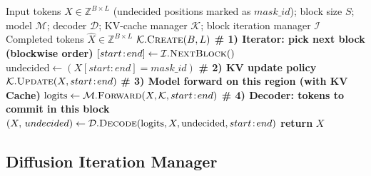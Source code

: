 \documentclass[]{antgroup}
\newcommand{\sys}{dInfer}
\begin{document}
\begin{algorithm}[H]
\caption{Blockwise dLLM Inference}

\label{alg:blockwise}
\begin{algorithmic}[1]
\Require Input tokens $X \in \mathbb{Z}^{B \times L}$ (undecided positions marked as $mask\_id$);
         block size $S$; model $\mathcal{M}$; decoder $\mathcal{D}$; KV-cache manager $\mathcal{K}$; block iteration manager $\mathcal{I}$
\Ensure  Completed tokens $\widehat{X} \in \mathbb{Z}^{B \times L}$
\State $\mathcal{K}.\textsc{Create}(B, L)$ 
\State \textbf{\# 1) Iterator: pick next block (blockwise order)}
\State $[start\!:\!end] \gets \mathcal{I}.\textsc{NextBlock}()$ 
\State $\text{undecided} \gets (X[start:end] = mask\_id)$ 
  \State \textbf{\# 2) KV update policy}
      \State $\mathcal{K}.\textsc{Update}(X, start\!:\!end)$
  \EndIf
  \State \textbf{\# 3) Model forward on this region (with KV Cache)}
  \State $\text{logits} \gets \mathcal{M}.\textsc{Forward}(X, \mathcal{K}, start\!:\!end)$
  \State \textbf{\# 4) Decoder: tokens to commit in this block}
  \State $(X,\, undecided) \gets \mathcal{D}.\textsc{Decode}(\text{logits}, X, \text{undecided}, start\!:\!end)$
\EndWhile
\EndWhile
\State \textbf{return} $X$ 
\end{algorithmic}
\end{algorithm}

\subsection{Diffusion Iteration Manager} \label{sec:diff_iter}

\end{document}
